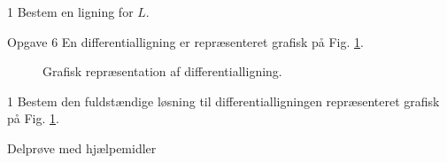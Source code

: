 \begin{delopgave}{}{1}
	Bestem en ligning for $L$.
\end{delopgave}
\begin{opgavetekst}{Opgave 6}
	En differentialligning er repræsenteret grafisk på Fig. \ref{fig:logist}.
	\begin{figure}[H]
		\centering
		\caption{Grafisk repræsentation af differentialligning.}
		\label{fig:logist}
	\end{figure}
	\phantom{h}
\end{opgavetekst}
\begin{delopgave}{}{1}
	Bestem den fuldstændige løsning til differentialligningen repræsenteret grafisk på  Fig. \ref{fig:logist}.
\end{delopgave}

\newpage
\begin{center}
\LARGE
Delprøve med hjælpemidler 
\end{center}


